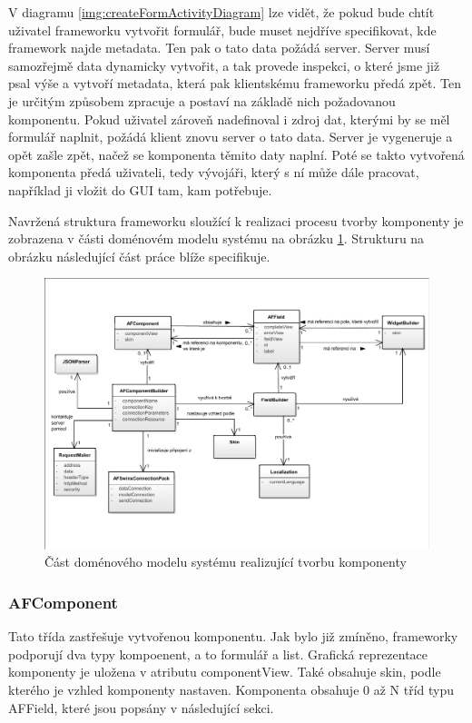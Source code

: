 V diagramu \ref{img:createFormActivityDiagram} lze vidět, že pokud bude chtít uživatel frameworku vytvořit formulář, bude muset nejdříve specifikovat, kde framework najde metadata. Ten pak o tato data požádá server. Server musí samozřejmě data dynamicky vytvořit, a tak provede inspekci, o které jsme již psal výše a vytvoří metadata, která pak klientskému frameworku předá zpět. Ten je určitým způsobem zpracuje a postaví na základě nich požadovanou komponentu. Pokud uživatel zároveň nadefinoval i zdroj dat, kterými by se měl formulář naplnit, požádá klient znovu server o tato data. Server je vygeneruje a opět zašle zpět, načež se komponenta těmito daty naplní. Poté se takto vytvořená komponenta předá uživateli, tedy vývojáři, který s ní může dále pracovat, například ji vložit do GUI tam, kam potřebuje.

Navržená struktura frameworku sloužící k realizaci procesu tvorby komponenty je zobrazena v části doménovém modelu systému na obrázku \ref{img:domainModelBuild}. Strukturu na obrázku následující část práce blíže specifikuje.

\begin{figure}[h!]
\includegraphics[width=\textwidth]{figures/domainModelBuild}
\caption{Část doménového modelu systému realizující tvorbu komponenty}
\label{img:domainModelBuild}
\end{figure}

\subsubsection{AFComponent}
Tato třída zastřešuje vytvořenou komponentu. Jak bylo již zmíněno, frameworky podporují dva typy kompoenent, a to formulář a list. Grafická reprezentace komponenty je uložena v atributu componentView. Také obsahuje skin, podle kterého je vzhled komponenty nastaven. Komponenta obsahuje 0 až N tříd typu AFField, které jsou popsány v následující sekci.

